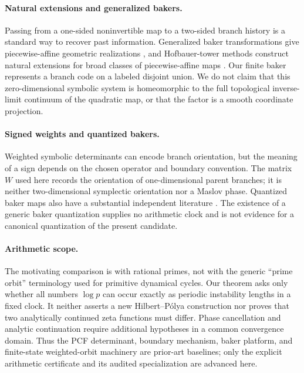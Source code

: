 \documentclass[11pt]{article}
\theoremstyle{definition}
\theoremstyle{remark}
\begin{document}
\paragraph{Natural extensions and generalized bakers.}
Passing from a one-sided noninvertible map to a two-sided branch history is a
standard way to recover past information.  Generalized baker transformations
give piecewise-affine geometric realizations \citep{bose1989generalized}, and
Hofbauer-tower methods construct natural extensions for broad classes of
piecewise-affine maps \citep{bruin2014natural}.  Our finite baker represents a
branch code on a labeled disjoint union.  We do not claim that this
zero-dimensional symbolic system is homeomorphic to the full topological
inverse-limit continuum of the quadratic map, or that the factor is a smooth
coordinate projection.

\paragraph{Signed weights and quantized bakers.}
Weighted symbolic determinants can encode branch orientation, but the meaning
of a sign depends on the chosen operator and boundary convention.  The matrix
\(W\) used here records the orientation of one-dimensional parent branches;
it is neither two-dimensional symplectic orientation nor a Maslov phase.
Quantized baker maps also have a substantial independent literature
\citep{balazs1989quantized,saraceno1990classical}.  The existence of a generic
baker quantization supplies no arithmetic clock and is not evidence for a
canonical quantization of the present candidate.

\paragraph{Arithmetic scope.}
The motivating comparison is with rational primes, not with the generic
``prime orbit'' terminology used for primitive dynamical cycles.  Our theorem
asks only whether all numbers \(\log p\) can occur exactly as periodic
instability lengths in a fixed clock.  It neither asserts a new
Hilbert--P\'olya construction nor proves that two analytically continued zeta
functions must differ.  Phase cancellation and analytic continuation require
additional hypotheses in a common convergence domain.  Thus the PCF
determinant, boundary mechanism, baker platform, and finite-state
weighted-orbit machinery are prior-art baselines; only the explicit arithmetic
certificate and its audited specialization are advanced here.
\end{document}
